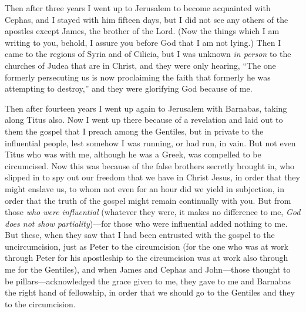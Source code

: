 \begin{biblechapter}
\verse Then after three years I went up to Jerusalem to become acquainted with Cephas, and I stayed with him fifteen days,
\verse but I did not see any others of the apostles except James, the brother of the Lord.
\verse (Now the things which I am writing to you, behold, I assure you before God that I am not lying.)
\verse Then I came to the regions of Syria and of Cilicia,
\verse but I was unknown \textit{in person} to the churches of Judea that are in Christ,
\verse and they were only hearing, “The one formerly persecuting us is now proclaiming the faith that formerly he was attempting to destroy,”
\verse and they were glorifying God because of me.
\end{biblechapter}

\begin{biblechapter} %
 Then after fourteen years I went up again to Jerusalem with Barnabas, taking along Titus also.
\verse Now I went up there because of a revelation and laid out to them the gospel that I preach among the Gentiles, but in private to the influential people, lest somehow I was running, or had run, in vain.
\verse But not even Titus who was with me, although he was a Greek, was compelled to be circumcised.
\verse Now this was because of the false brothers secretly brought in, who slipped in to spy out our freedom that we have in Christ Jesus, in order that they might enslave us,
\verse to whom not even for an hour did we yield in subjection, in order that the truth of the gospel might remain continually with you.
\verse But from those \textit{who were influential} (whatever they were, it makes no difference to me, \textit{God does not show partiality})—for those who were influential added nothing to me.
\verse But these, when they saw that I had been entrusted with the gospel to the uncircumcision, just as Peter to the circumcision
\verse (for the one who was at work through Peter for his apostleship to the circumcision was at work also through me for the Gentiles),
\verse and when James and Cephas and John—those thought to be pillars—acknowledged the grace given to me, they gave to me and Barnabas the right hand of fellowship, in order that we should go to the Gentiles and they to the circumcision.

\end{biblechapter}
